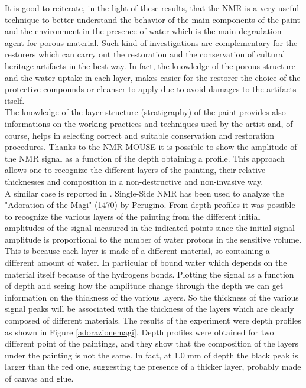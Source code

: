 \documentclass[a4paper,11pt]{report}
\begin{document}
  It is good to reiterate, in the light of these results, that the NMR is a very useful technique to better understand the behavior of the main components of the paint and the environment in the presence of water which is the main degradation agent for porous material. Such kind of investigations are complementary for the restorers which can carry out the restoration and the conservation of cultural heritage artifacts in the best way. In fact, the knowledge of the porous structure and the water uptake in each layer, makes easier for the restorer the choice of the protective compounds or cleanser to apply due to avoid damages to the artifacts itself.\\
The knowledge of the layer structure (stratigraphy) of the paint provides also informations on the working practices and techniques used by the artist and, of course, helps in selecting correct and suitable conservation and restoration procedures. Thanks to the NMR-MOUSE it is possible to show the amplitude of the NMR signal as a function of the depth obtaining a profile. This approach allows one to recognize the different layers of the painting, their relative thicknesses and composition in a non-destructive and non-invasive way.\\
A similar case is reported in \cite{quattropaint}. Single-Side NMR has been used to analyze the "Adoration of the Magi" (1470) by Perugino. From depth profiles it was possible to recognize the various layers of the painting from the different initial amplitudes of the signal measured in the indicated points since the initial signal amplitude is proportional to the number of water protons in the sensitive volume. This is  because each layer is made of a different material, so containing a different amount of water. In particular of bound water which depends on the material itself because of the hydrogens bonds. Plotting the signal as a function of depth and seeing how the amplitude change through the depth we can get information on the thickness of the various layers. So the thickness of the various signal peaks will be associated with the thickness of the layers which are clearly composed of different materials. The results of the experiment were depth profiles as shown in Figure \ref{adorazionemagi}. Depth profiles were obtained for two different point of the paintings, and they show that the composition of the layers under the painting is not the same. In fact, at 1.0 mm of depth the black peak is larger than the red one, suggesting the presence of a thicker layer, probably made of canvas and glue.\\
\end{document}
